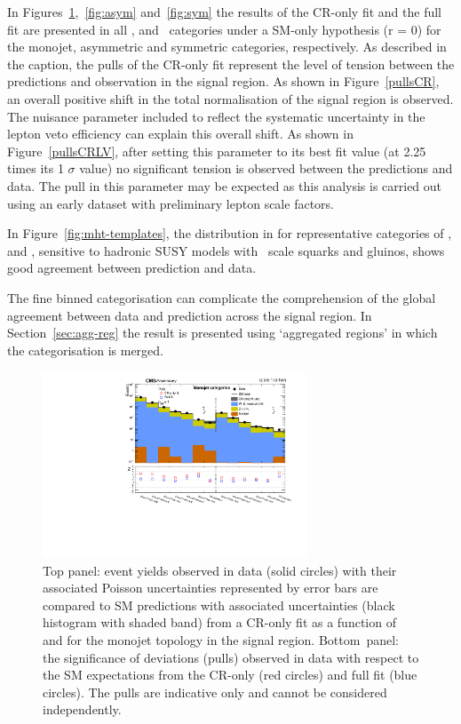 In Figures~\ref{fig:mono},~\ref{fig:asym} and~\ref{fig:sym} the results of the CR-only fit and the full fit are presented in all \scalht, \njet 
and \nb~categories under a SM-only hypothesis (r = 0) for the monojet, asymmetric 
and symmetric categories, respectively. As described in the caption, the pulls of the CR-only fit represent the level of tension 
between the predictions and observation in the signal region. As shown in Figure~\ref{pullsCR}, an overall positive shift in the
total normalisation of the signal region is observed. The nuisance parameter
included to reflect the systematic uncertainty in the lepton veto efficiency can explain
this overall shift. As shown in Figure~\ref{pullsCRLV}, after setting this parameter to its best fit value 
(at 2.25 times its 1 $\sigma$ value) no significant tension is observed between the predictions and data. 
The pull in this parameter may be expected as this analysis is carried out using an early dataset with preliminary 
lepton scale factors.

In Figure~\ref{fig:mht-templates}, the distribution in \mht for representative 
categories of \scalht, \njet and \nb, sensitive to hadronic SUSY models with \TeV~scale squarks and gluinos, 
shows good agreement between prediction and data.

The fine binned categorisation can complicate the comprehension of the global agreement between data and 
prediction across the signal region. In Section~\ref{sec:agg-reg} the result is presented using 
`aggregated regions' in which the categorisation is merged. 

\begin{figure}[!h]
  \begin{center}
    \includegraphics[width=0.7\textwidth]{Figures/statisticalResults/summaryPlot_Monojet_prefit_overlay_fit_b}
    \caption{Top panel: event yields observed in data (solid circles) 
	with their associated Poisson uncertainties represented by error bars 
	are compared to SM predictions with associated uncertainties (black
      histogram with shaded band) from a CR-only fit as a function of
      \nb~ and \scalht for the monojet topology in the
      signal region. Bottom~panel: the significance of deviations
      (pulls) observed in data with respect to the SM expectations
      from the CR-only (red circles) and full fit (blue circles). The
      pulls are indicative only and cannot be considered
      independently.}
    \label{fig:mono}
  \end{center}
\end{figure}

